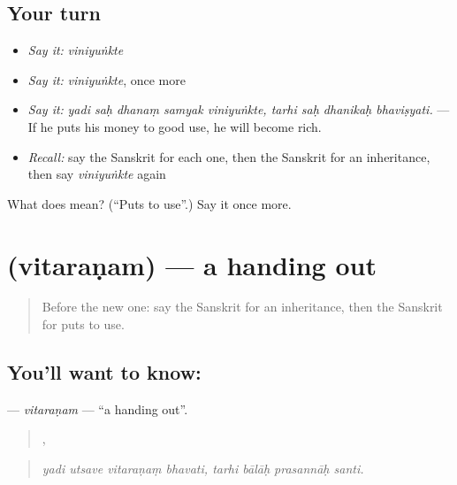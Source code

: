 \subsection*{Your turn}
\begin{itemize}
\raggedright
  \item \emph{Say it:} \emph{viniyuṅkte}
  \item \emph{Say it:} \emph{viniyuṅkte}, once more
  \item \emph{Say it:} \emph{yadi saḥ dhanaṃ samyak viniyuṅkte, tarhi saḥ dhanikaḥ bhaviṣyati.} — If he puts his money to good use, he will become rich.
  \item \emph{Recall:} say the Sanskrit for each one, then the Sanskrit for an inheritance, then say \emph{viniyuṅkte} again
\end{itemize}

\begin{tcolorbox}[breakable,colback=teal!4,colframe=teal!35!black,title={Before you move on}]
What does  mean? (\textquotedblleft{}Puts to use\textquotedblright{}.) Say it once more.
\end{tcolorbox}
\section[\texorpdfstring{\sk{वितरणम्} (vitaraṇam)}{वितरणम् (vitaraṇam)}]{ (vitaraṇam) — a handing out}

\label{lesson:SA-C550-vitaranam}



\begin{quote}
Before the new one: say the Sanskrit for an inheritance, then the Sanskrit for puts to use.
\end{quote}

\subsection*{You'll want to know: }
\textbf{} — \emph{vitaraṇam} — \textquotedblleft{}a handing out\textquotedblright{}.

\begin{quote}
   ,    
\end{quote}

\begin{quote}
\emph{yadi utsave vitaraṇaṃ bhavati, tarhi bālāḥ prasannāḥ santi.}
\end{quote}

